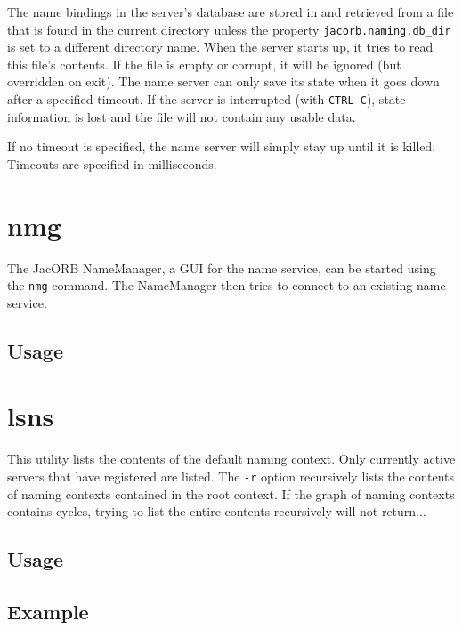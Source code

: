 The name bindings in the server's database are stored in and retrieved
from a file that is found in the current directory unless the property
{\tt jacorb.naming.db\_dir} is set to a different directory name. When
the server  starts up, it tries  to read this file's  contents. If the
file  is  empty or  corrupt,  it will  be  ignored  (but overridden  on
exit). The name server can only save its state when it goes down after
a specified timeout. If the server is interrupted (with {\tt CTRL-C}),
state information  is lost  and the file  will not contain  any usable
data.

If no timeout is specified, the name server will simply stay up until
it is killed. Timeouts are specified in milliseconds.

\section{nmg}

The JacORB  NameManager, a  GUI for the  name service, can  be started
using the {\tt nmg} command.  The NameManager then tries to connect to
an existing name service.

\subsection*{Usage}


\section{lsns}

This utility  lists the contents  of the default naming  context. Only
currently active servers that have registered are listed. The {\tt -r}
option recursively lists the  contents of naming contexts contained in
the root  context. If  the graph of  naming contexts  contains cycles,
trying to list the entire contents recursively will not return...

\subsection*{Usage}



\subsection*{Example}



